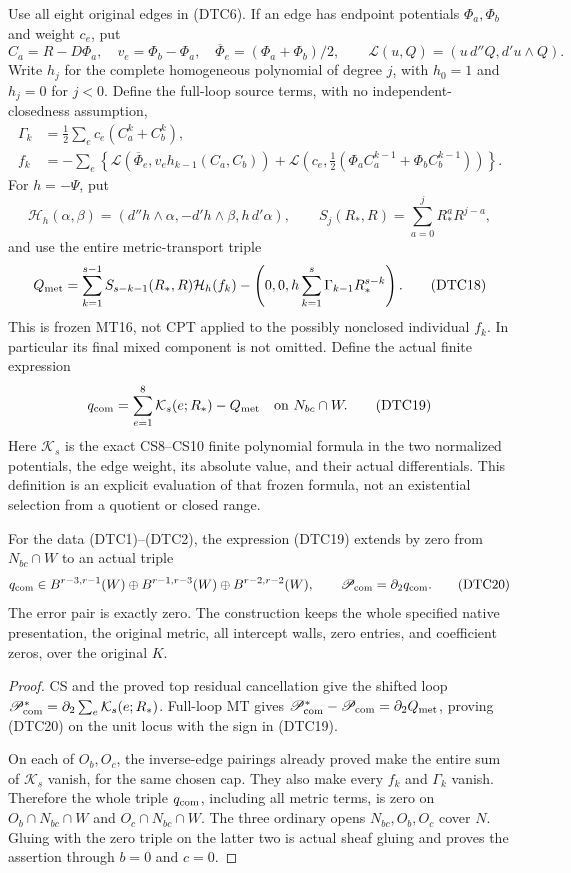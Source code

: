 Use all eight original edges in (DTC6).  If an edge has endpoint
potentials $\Phi_a,\Phi_b$ and weight $c_e$, put
\[
 C_a=R-D\Phi_a,\quad v_e=\Phi_b-\Phi_a,\quad
 \overline\Phi_e=(\Phi_a+\Phi_b)/2,
 \qquad \mathcal L(u,Q)=(u\,d''Q,d'u\wedge Q).
 \tag{DTC15}
\]
Write $h_j$ for the complete homogeneous polynomial of degree $j$,
with $h_0=1$ and $h_j=0$ for $j<0$.  Define the full-loop source
terms, with no independent-closedness assumption,
\[
 \begin{split}
 \Gamma_k&=\tfrac12\sum_e c_e(C_a^k+C_b^k),\\
 f_k&=-\sum_e\left\{
 \mathcal L(\overline\Phi_e,v_eh_{k-1}(C_a,C_b))
 +\mathcal L\left(c_e,\tfrac12
       (\Phi_aC_a^{k-1}+\Phi_bC_b^{k-1})\right)\right\}.
 \end{split}
 \tag{DTC16}
\]
For $h=-\Psi$, put
\[
 \mathcal H_h(\alpha,\beta)
 =(d''h\wedge\alpha,-d'h\wedge\beta,h\,d'\alpha),
 \qquad
 S_j(R_*,R)=\sum_{a=0}^jR_*^aR^{j-a},
 \tag{DTC17}
\]
and use the entire metric-transport triple
\[
 Q_{\rm met}=
 \sum_{k=1}^{s-1}S_{s-k-1}(R_*,R)\mathcal H_h(f_k)
 -\left(0,0,h\sum_{k=1}^s\Gamma_{k-1}R_*^{s-k}\right).
 \tag{DTC18}
\]
This is frozen MT16, not CPT applied to the possibly nonclosed
individual $f_k$.  In particular its final mixed component is not
omitted.  Define the actual finite expression
\[
 q_{\rm com}=\sum_{e=1}^8\mathcal K_s(e;R_*)-Q_{\rm met}
 \quad\hbox{on }N_{bc}\cap W.
 \tag{DTC19}
\]
Here $\mathcal K_s$ is the exact CS8--CS10 finite polynomial
formula in the two normalized potentials, the edge weight, its
absolute value, and their actual differentials.  This definition
is an explicit evaluation of that frozen formula, not an
existential selection from a quotient or closed range.

\begin{theorem}
For the data (DTC1)--(DTC2), the expression (DTC19) extends by zero
from $N_{bc}\cap W$ to an actual triple
\[
 q_{\rm com}\in
 B^{r-3,r-1}(W)\oplus B^{r-1,r-3}(W)\oplus B^{r-2,r-2}(W),
 \qquad
             \mathscr P_{\rm com}=\partial_2q_{\rm com}.
 \tag{DTC20}
\]
The error pair is exactly zero.  The construction keeps the whole
specified native presentation, the original metric, all intercept
walls, zero entries, and coefficient zeros, over the original $K$.
\end{theorem}

\begin{proof}
CS and the proved top residual cancellation give the shifted loop
$\mathscr P_{\rm com}^*=\partial_2\sum_e\mathcal K_s(e;R_*)$.
Full-loop MT gives
$\mathscr P_{\rm com}^*-\mathscr P_{\rm com}
=\partial_2Q_{\rm met}$, proving (DTC20) on the unit locus with
the sign in (DTC19).

On each of $O_b,O_c$, the inverse-edge pairings already proved
make the entire sum of $\mathcal K_s$ vanish, for the same chosen
cap.  They also make every $f_k$ and $\Gamma_k$ vanish.  Therefore
the whole triple $q_{\rm com}$, including all metric terms, is zero
on $O_b\cap N_{bc}\cap W$ and $O_c\cap N_{bc}\cap W$.
The three ordinary opens $N_{bc},O_b,O_c$ cover $N$.
Gluing with the zero triple on the latter two is actual sheaf
gluing and proves the assertion through $b=0$ and $c=0$.
\end{proof}

